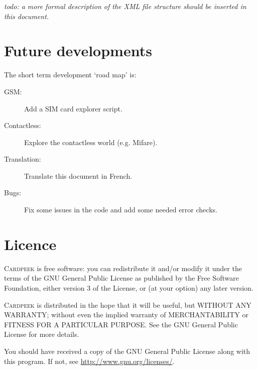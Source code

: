 \documentclass[11pt]{report}
\newcommand{\Cardpeek}{\textsc{Cardpeek}}
\begin{document}
\noindent
\textit{todo: a more formal description of the XML file structure should be inserted in this document.}

\chapter{Future developments}

The short term development `road map' is:
\begin{description}
\item[GSM:]{Add a SIM card explorer script.}
\item[Contactless:]{Explore the contactless world (e.g. Mifare).}
\item[Translation:]{Translate this document in French.}
\item[Bugs:]{Fix some issues in the code and add some needed error checks.}
\end{description}

\chapter{Licence}
\label{chapter:licence}

\Cardpeek{} is free software: you can redistribute it and/or modify
it under the terms of the GNU General Public License as published by
the Free Software Foundation, either version 3 of the License, or
(at your option) any later version.

\Cardpeek{} is distributed in the hope that it will be useful,
but WITHOUT ANY WARRANTY; without even the implied warranty of
MERCHANTABILITY or FITNESS FOR A PARTICULAR PURPOSE.  See the
GNU General Public License for more details.

You should have received a copy of the GNU General Public License
along with this program.  If not, see \url{http://www.gnu.org/licenses/}.
\end{document}
